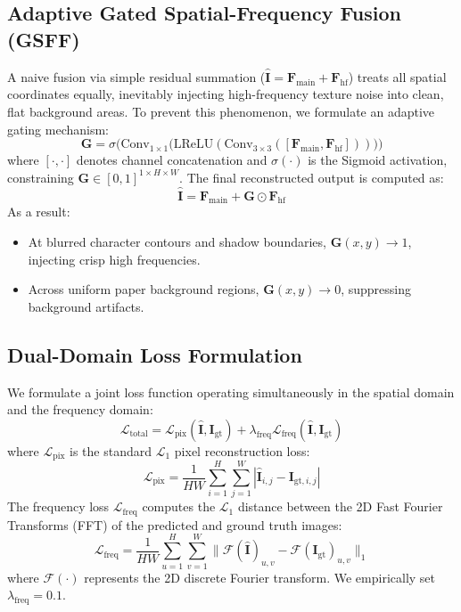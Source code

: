 \documentclass[conference]{IEEEtran}
\begin{document}
\subsection{Adaptive Gated Spatial-Frequency Fusion (GSFF)}
A naive fusion via simple residual summation ($\hat{\mathbf{I}} = \mathbf{F}_{\text{main}} + \mathbf{F}_{\text{hf}}$) treats all spatial coordinates equally, inevitably injecting high-frequency texture noise into clean, flat background areas. To prevent this phenomenon, we formulate an adaptive gating mechanism:
\begin{equation}
\mathbf{G} = \sigma\Big(\text{Conv}_{1\times 1}\big(\text{LReLU}(\text{Conv}_{3\times 3}([\mathbf{F}_{\text{main}}, \mathbf{F}_{\text{hf}}]))\big)\Big)
\end{equation}
where $[\cdot, \cdot]$ denotes channel concatenation and $\sigma(\cdot)$ is the Sigmoid activation, constraining $\mathbf{G} \in [0, 1]^{1 \times H \times W}$. The final reconstructed output is computed as:
\begin{equation}
\hat{\mathbf{I}} = \mathbf{F}_{\text{main}} + \mathbf{G} \odot \mathbf{F}_{\text{hf}}
\end{equation}
As a result:
\begin{itemize}
    \item At blurred character contours and shadow boundaries, $\mathbf{G}(x, y) \to 1$, injecting crisp high frequencies.
    \item Across uniform paper background regions, $\mathbf{G}(x, y) \to 0$, suppressing background artifacts.
\end{itemize}

\subsection{Dual-Domain Loss Formulation}
We formulate a joint loss function operating simultaneously in the spatial domain and the frequency domain:
\begin{equation}
\mathcal{L}_{\text{total}} = \mathcal{L}_{\text{pix}}(\hat{\mathbf{I}}, \mathbf{I}_{\text{gt}}) + \lambda_{\text{freq}} \mathcal{L}_{\text{freq}}(\hat{\mathbf{I}}, \mathbf{I}_{\text{gt}})
\end{equation}
where $\mathcal{L}_{\text{pix}}$ is the standard $\mathcal{L}_1$ pixel reconstruction loss:
\begin{equation}
\mathcal{L}_{\text{pix}} = \frac{1}{HW} \sum_{i=1}^H \sum_{j=1}^W |\hat{\mathbf{I}}_{i,j} - \mathbf{I}_{\text{gt}, i,j}|
\end{equation}
The frequency loss $\mathcal{L}_{\text{freq}}$ computes the $\mathcal{L}_1$ distance between the 2D Fast Fourier Transforms (FFT) of the predicted and ground truth images:
\begin{equation}
\mathcal{L}_{\text{freq}} = \frac{1}{HW} \sum_{u=1}^H \sum_{v=1}^W \|\mathcal{F}(\hat{\mathbf{I}})_{u,v} - \mathcal{F}(\mathbf{I}_{\text{gt}})_{u,v}\|_1
\end{equation}
where $\mathcal{F}(\cdot)$ represents the 2D discrete Fourier transform. We empirically set $\lambda_{\text{freq}} = 0.1$.
\end{document}
